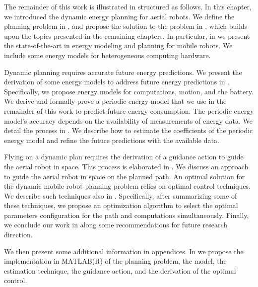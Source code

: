 The remainder of this work is illustrated in  structured as follows. In this chapter, we introduced the dynamic energy planning for aerial robots. We define the planning problem in , and propose the solution to the problem in , which builds upon the topics presented in the remaining chapters. In particular, in  we present the state-of-the-art in energy modeling and planning for mobile robots. We include some energy models for heterogeneous computing hardware.

Dynamic planning requires accurate future energy predictions. We present the derivation of some energy models to address future energy predictions in . Specifically, we propose energy models for computations, motion, and the battery. We derive and formally prove a periodic energy model that we use in the remainder of this work to predict future energy consumption. The periodic energy model's accuracy depends on the availability of measurements of energy data. We detail the process in . We describe how to estimate the coefficients of the periodic energy model and refine the future predictions with the available data.

Flying on a dynamic plan requires the derivation of a guidance action to guide the aerial robot in space. This process is elaborated in . We discuss an approach to guide the aerial robot in space on the planned path. 
An optimal solution for the dynamic mobile robot planning problem relies on optimal control techniques. We describe such techniques also in . Specifically, after summarizing some of these techniques, we propose an optimization algorithm to select the optimal parameters configuration for the path and computations simultaneously. Finally, we conclude our work in  along some recommendations for future research direction. 

We then present some additional information in appendices. In  we propose the implementation in MATLAB(R) of the planning problem, the model, the estimation technique, the guidance action, and the derivation of the optimal control. 

